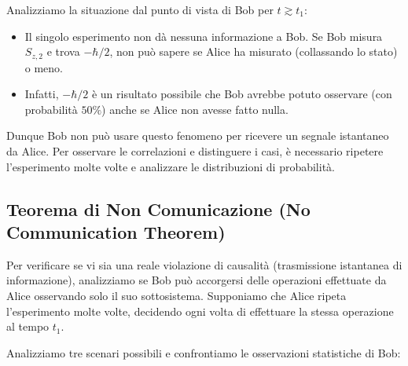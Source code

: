 Analizziamo la situazione dal punto di vista di Bob per $t \gtrsim t_1$:
\begin{itemize}
    \item Il singolo esperimento non dà nessuna informazione a Bob. Se Bob misura $S_{z,2}$ e trova $-\hbar/2$, non può sapere se Alice ha misurato (collassando lo stato) o meno.
    \item Infatti, $-\hbar/2$ è un risultato possibile che Bob avrebbe potuto osservare (con probabilità $50\%$) anche se Alice non avesse fatto nulla.
\end{itemize}
Dunque Bob non può usare questo fenomeno per ricevere un segnale istantaneo da Alice. Per osservare le correlazioni e distinguere i casi, è necessario ripetere l'esperimento molte volte e analizzare le distribuzioni di probabilità.


\subsection{Teorema di Non Comunicazione (No Communication Theorem)}

Per verificare se vi sia una reale violazione di causalità (trasmissione istantanea di informazione), analizziamo se Bob può accorgersi delle operazioni effettuate da Alice osservando solo il suo sottosistema.
Supponiamo che Alice ripeta l'esperimento molte volte, decidendo ogni volta di effettuare la stessa operazione al tempo $t_1$.

Analizziamo tre scenari possibili e confrontiamo le osservazioni statistiche di Bob:

